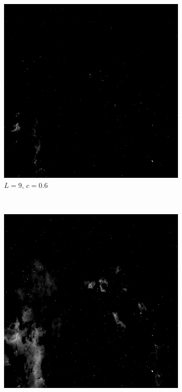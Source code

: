 \documentclass{article}
\begin{document}
\begin{enumerate}[label=(\alph*)]
\begin{figure}[!htb]
        \begin{subfigure}[b]{0.3\textwidth}
            \includegraphics[width=\textwidth]{img/C_9_06.png}
            \caption{$L = 9$, $c = 0.6$}
        \end{subfigure}
        ~
        \begin{subfigure}[b]{0.3\textwidth}
            \includegraphics[width=\textwidth]{img/C_9_07.png}

\end{subfigure}
\end{figure}
\end{enumerate}
\end{document}
